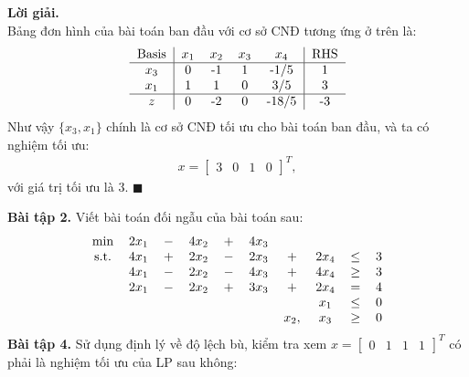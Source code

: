 \documentclass[12pt]{article}
\newenvironment{solution}{%
     \setlength\parindent{0pt}\par\medskip\textbf{Lời giải.}\quad}{%
     \hfill\tiny$\blacksquare$\par\medskip}
\begin{document}
\begin{solution}
        \\
        Bảng đơn hình của bài toán ban đầu với cơ sở CNĐ tương ứng ở trên là:
        \begin{align*}
            \begin{tabular}{c|cccc|cc}
                \text{Basis} & $x_1$ & $x_2$ & $x_3$ & $x_4$ & RHS \\ \hline
                $x_3$ & 0 & -1 & 1 & -1/5 & 1 \\
                $x_1$ & 1 & 1 & 0 & 3/5 & 3 \\ \hline
                $z$ & 0 & -2 & 0 & -18/5 & -3 \\
            \end{tabular}
        \end{align*}
        Như vậy $\{x_3, x_1\}$ chính là cơ sở CNĐ tối ưu cho bài toán ban đầu, và ta có nghiệm tối ưu:
        \begin{align*}
            x = \begin{bmatrix}
                3 & 0 & 1 & 0
            \end{bmatrix}^T,
        \end{align*}
        với giá trị tối ưu là 3.
    \end{solution}
    \textbf{Bài tập 2.} Viết bài toán đối ngẫu của bài toán sau:
    \begin{align*}
        \begin{tabular}{cccccccccc}
            \text{min} & $2x_1$ & $-$ & $4x_2$ & $+$ & $4x_3$ \\
            \text{s.t.} & $4x_1$ & $+$ & $2x_2$ & $-$ & $2x_3$ & $+$ & $2x_4$ & $\leq$ & 3 \\
            & $4x_1$ & $-$ & $2x_2$ & $-$ & $4x_3$ & $+$ & $4x_4$ & $\geq$ & 3 \\
            & $2x_1$ & $-$ & $2x_2$ & $+$ & $3x_3$ & $+$ & $2x_4$ & $=$ & 4 \\
            & & & & & & & $x_1$ & $\leq$ & 0\\
            & & & & & & $x_2,$ & $x_3$ & $\geq$ & 0\\
        \end{tabular}
    \end{align*}
    \textbf{Bài tập 4.} Sử dụng định lý về độ lệch bù, kiểm tra xem $x = \begin{bmatrix} 0 & 1 & 1 & 1 \end{bmatrix}^T$ có phải là nghiệm tối ưu của LP sau không:
\end{document}
